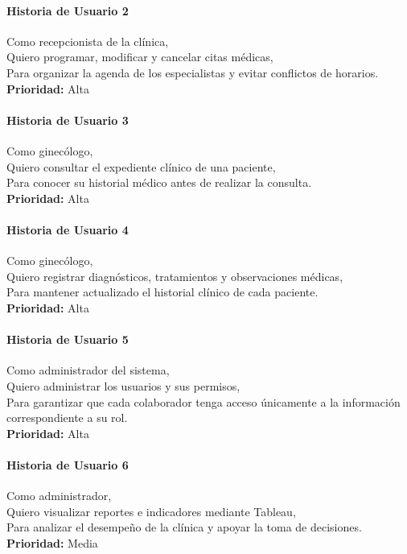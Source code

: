 \documentclass[12pt,letterpaper]{article}
\begin{document}
\paragraph{Historia de Usuario 2}
Como recepcionista de la clínica,\\
Quiero programar, modificar y cancelar citas médicas,\\
Para organizar la agenda de los especialistas y evitar conflictos de horarios.\\
\textbf{Prioridad:} Alta

\paragraph{Historia de Usuario 3}
Como ginecólogo,\\
Quiero consultar el expediente clínico de una paciente,\\
Para conocer su historial médico antes de realizar la consulta.\\
\textbf{Prioridad:} Alta

\paragraph{Historia de Usuario 4}
Como ginecólogo,\\
Quiero registrar diagnósticos, tratamientos y observaciones médicas,\\
Para mantener actualizado el historial clínico de cada paciente.\\
\textbf{Prioridad:} Alta

\paragraph{Historia de Usuario 5}
Como administrador del sistema,\\
Quiero administrar los usuarios y sus permisos,\\
Para garantizar que cada colaborador tenga acceso únicamente a la información
correspondiente a su rol.\\
\textbf{Prioridad:} Alta

\paragraph{Historia de Usuario 6}
Como administrador,\\
Quiero visualizar reportes e indicadores mediante Tableau,\\
Para analizar el desempeño de la clínica y apoyar la toma de decisiones.\\
\textbf{Prioridad:} Media
\end{document}
